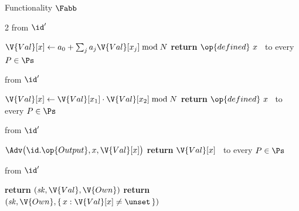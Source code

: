 \begin{interface}[nofloat]{Functionality $\Fabb$ \\
}
{\begin{multicols}{2}
 \quad from $\id'$
\begin{algorithmic}[1]
\algcont
{}
\State $\V{Val}[x] \gets a_0 + \textstyle\sum_j a_j \V{Val}[x_j] \bmod N$ \label{ln:abblin}
\State \textbf{return} $\op{defined}\ x$ \ to every $P \in \Ps$
\algsave
\end{algorithmic}
\vspace{1.4ex}

 \quad from $\id'$
\begin{algorithmic}[1]
\algcont
{}
 \label{ln:abbprivmul}
\State $\V{Val}[x] \gets \V{Val}[x_1] \cdot \V{Val}[x_2] \bmod N$ \label{ln:abbmul}
\State \textbf{return} $\op{defined}\ x$ \ to every $P \in \Ps$
\algsave
\end{algorithmic}
\vspace{1.4ex}

 \quad from $\id'$
\begin{algorithmic}[1]
\algcont
{}
\State $\Adv\bigl(\id.\op{Output}, x, \V{Val}[x]\bigr)$ \label{ln:abbadvfirst}
\State \textbf{return} $\V{Val}[x]$ \ to every $P \in \Ps$
\algsave
\end{algorithmic}
\vspace{1.4ex}

 \quad from $\id'$
\begin{algorithmic}[1]
\algcont
{}
  \State \textbf{return} $(\mathit{sk}, \V{Val}, \V{Own})$ \label{ln:abbgiveup}
\EndIf
\State \textbf{return} $(\mathit{sk}, \V{Own}, \{\, x : \V{Val}[x] \neq \unset \,\})$ \label{ln:abbleak}
\algsave
\end{algorithmic}
\end{multicols}}
\end{interface}
